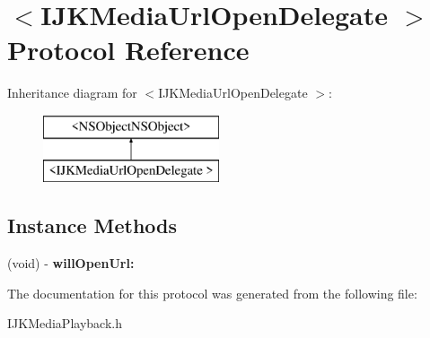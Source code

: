 \hypertarget{protocol_i_j_k_media_url_open_delegate_01-p}{}\section{$<$I\+J\+K\+Media\+Url\+Open\+Delegate $>$ Protocol Reference}
\label{protocol_i_j_k_media_url_open_delegate_01-p}
Inheritance diagram for $<$I\+J\+K\+Media\+Url\+Open\+Delegate $>$\+:\begin{figure}[H]
\begin{center}
\leavevmode
\includegraphics[height=2.000000cm]{protocol_i_j_k_media_url_open_delegate_01-p}
\end{center}
\end{figure}
\subsection*{Instance Methods}
\begin{DoxyCompactItemize}
\item 
\mbox{\label{protocol_i_j_k_media_url_open_delegate_01-p_a35bc54d1974b670290ac96cd857a21f5}} 
(void) -\/ {\bfseries will\+Open\+Url\+:}
\end{DoxyCompactItemize}


The documentation for this protocol was generated from the following file\+:\begin{DoxyCompactItemize}
\item 
I\+J\+K\+Media\+Playback.\+h\end{DoxyCompactItemize}
